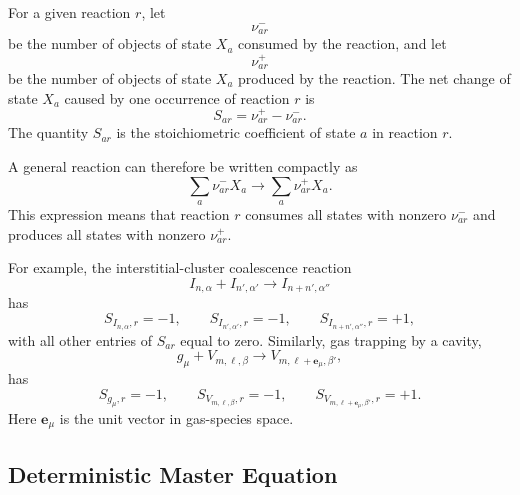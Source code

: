 For a given reaction $r$, let
\begin{equation}
    \nu^-_{ar}
\end{equation}
be the number of objects of state $X_a$ consumed by the reaction, and let
\begin{equation}
    \nu^+_{ar}
\end{equation}
be the number of objects of state $X_a$ produced by the reaction. The net
change of state $X_a$ caused by one occurrence of reaction $r$ is
\begin{equation}
    S_{ar}
    =
    \nu^+_{ar}-\nu^-_{ar} .
    \label{eq:stoich_increment}
\end{equation}
The quantity $S_{ar}$ is the stoichiometric coefficient of state $a$ in
reaction $r$.

A general reaction can therefore be written compactly as
\begin{equation}
    \sum_a \nu^-_{ar} X_a
    \longrightarrow
    \sum_a \nu^+_{ar} X_a .
    \label{eq:general_reaction_network_form}
\end{equation}
This expression means that reaction $r$ consumes all states with nonzero
$\nu^-_{ar}$ and produces all states with nonzero $\nu^+_{ar}$.

For example, the interstitial-cluster coalescence reaction
\begin{equation}
    I_{n,\alpha}+I_{n',\alpha'}
    \longrightarrow
    I_{n+n',\alpha''}
    \label{eq:example_II_stoich}
\end{equation}
has
\begin{equation}
    S_{I_{n,\alpha},r}=-1,
    \qquad
    S_{I_{n',\alpha'},r}=-1,
    \qquad
    S_{I_{n+n',\alpha''},r}=+1,
\end{equation}
with all other entries of $S_{ar}$ equal to zero. Similarly, gas trapping by a
cavity,
\begin{equation}
    g_\mu + V_{m,\boldsymbol{\ell},\beta}
    \longrightarrow
    V_{m,\boldsymbol{\ell}+\mathbf{e}_\mu,\beta'},
    \label{eq:example_gas_trapping_stoich}
\end{equation}
has
\begin{equation}
    S_{g_\mu,r}=-1,
    \qquad
    S_{V_{m,\boldsymbol{\ell},\beta},r}=-1,
    \qquad
    S_{V_{m,\boldsymbol{\ell}+\mathbf{e}_\mu,\beta'},r}=+1.
\end{equation}
Here $\mathbf{e}_\mu$ is the unit vector in gas-species space.

\subsection{Deterministic Master Equation}
\label{sec:deterministic_master_equation}

